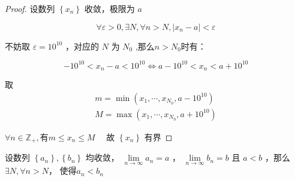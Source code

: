 \begin{proof}
	设数列 $\left\{x_n\right\}$ 收敛，极限为 $a$
	
	$$
	\forall \varepsilon>0, \exists N , \forall n>N ,\left|x_n-a\right|<\varepsilon
	$$
	
	
	不妨取 $\varepsilon=10^{10}$ ，对应的 $N$ 为 $N_0$ ,那么$n>N_0$时有：
	
	$$
	-10^{10}<x_n-a<10^{10} \Leftrightarrow a-10^{10}<x_n<a + 10^{10}
	$$
	
	
	取 
	\begin{align*}
		m=\min \left(x_1, \cdots, x_{N_0}, a-10^{10}\right)\\	
		M=\max \left(x_1, \cdots, x_{N_0}, a+10^{10}\right)
	\end{align*}
	
	$\forall n \in \mathbb{Z}_+ ,\textbf{有} m \leqslant x_n \leqslant M \quad$ 故 $\left\{x_n\right\}$ 有界
\end{proof}
\begin{proposition}\label{数列的保序性}
	设数列 $\left\{a_n\right\},\left\{b_n\right\}$ 均收敛， $\lim\limits _{n \rightarrow \infty} a_n=a$ ， $\lim\limits _{n \rightarrow \infty} b_n=b$ 且 $a<b$ ，那么 $\exists N, \forall n>N$， 使得$a_n<b_n$
	
\end{proposition}

